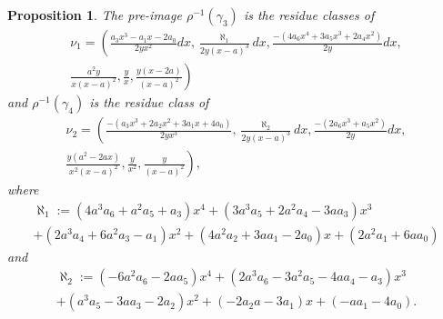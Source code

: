 \documentclass[draft, 11pt]{article} %
\theoremstyle{plain}
\newtheorem{prop}[defn]{Proposition}
\theoremstyle{remark}
\begin{document}
\begin{prop}\label{basis22}
The pre-image $\rho^{-1}(\gamma_3)$ is the residue classes of
\begin{multline*}
\nu_1 = \left(\frac{a_3x^3-a_1x-2a_0}{2yx^2}dx, \frac{\aleph_1}{2y(x-a)^3}dx, \frac{-(4a_6x^4+3a_5x^3+2a_4x^2)}{2y}dx,  \right. \\ \left. \frac{a^2y}{x(x-a)^2}, \frac{y}{x},  \frac{y(x-2a)}{(x-a)^2} \right)
\end{multline*}
and $\rho^{-1}(\gamma_4)$ is the residue class of
\begin{multline*}
\nu_2 = \left( \frac{-(a_3x^3+2a_2x^2+3a_1x+4a_0)}{2yx^3},  \frac{\aleph_2}{2y(x-a)^3}dx, \frac{-(2a_6x^3+a_5x^2)}{2y}dx, \right. \\ \left.  \frac{y(a^2-2ax)}{x^2(x-a)^2},\frac{y}{x^2}, \frac{y}{(x-a)^2} \right),
\end{multline*}
where
\begin{multline*}
\aleph_1  := (4a^3a_6+a^2a_5+a_3)x^4 + (3a^3a_5+2a^2a_4-3aa_3)x^3 \\
 + (2a^3a_4 + 6a^2a_3 - a_1)x^2 + (4a^2a_2 +3aa_1-2a_0)x+(2a^2a_1+6aa_0)
\end{multline*}
and
\begin{multline*}
\aleph_2  := (-6a^2a_6-2aa_5)x^4 + (2a^3a_6-3a^2a_5-4aa_4-a_3)x^3 \\ + (a^3a_5-3aa_3-2a_2)x^2 + (-2a_2a-3a_1)x +(-aa_1-4a_0).
\end{multline*}
\end{prop}
\end{document}
